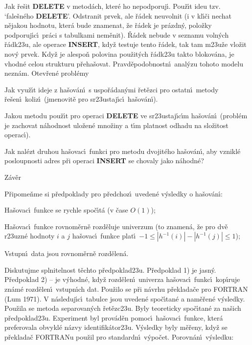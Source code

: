 \flushpar Jak \v re\v sit {\bf DELETE} v metod\'ach, kter\'e ho 
nepodporuj\'\i .\newline 
Pou\v z\'\i t ideu tzv. `fale\v sn\'eho {\bf DELETE}'. 
Odstranit prvek, ale \v r\'adek neuvolnit (i v kl\'\i\v ci nechat 
n\v ejakou hodnotu, kter\'a bude znamenat, \v ze \v r\'adek je 
pr\'azdn\'y, polo\v zky podporuj\'\i c\'\i\ pr\'aci s tabulkami nem\v enit). 
\v R\'adek nebude v seznamu voln\'ych \v r\'adk\accent23u, ale 
operace {\bf INSERT}, kdy\v z testuje tento \v r\'adek, tak tam 
m\accent23u\v ze vlo\v zit nov\'y prvek. Kdy\v z je alespo\v n 
polovina pou\v zit\'ych \v r\'adk\accent23u takto blokov\'ana, je 
vhodn\'e celou strukturu p\v reha\v sovat. Prav\-d\v epodobnostn\'\i\ 
anal\'yzu tohoto modelu nezn\'am.
\medskip
\subhead
Otev\v ren\'e probl\'emy
\endsubhead
\smallskip

\flushpar Jak vyu\v z\'\i t ideje z ha\v sov\'an\'\i\ s uspo\v r\'adan\'ymi 
\v ret\v ezci pro ostatn\'\i\ metody \v re\v sen\'\i\ koliz\'\i\ 
(jmeno\-vit\v e pro sr\accent23ustaj\'\i c\'\i\ ha\v sov\'an\'\i ).
\medskip

\flushpar Jakou metodu pou\v z\'\i t pro operaci {\bf DELETE} ve 
sr\accent23ustaj\'\i c\'\i m ha\v sov\'an\'\i\ (probl\'em je zachovat n\'ahodnost 
ulo\v zen\'e mno\v ziny a t\'\i m platnost odhadu na slo\v zitost operac\'\i ). 
\medskip

\flushpar Jak nal\'ezt druhou ha\v sovac\'\i\ funkci pro metodu 
dvojit\'eho ha\v so\-v\'a\-n\'\i , aby vznikl\'e posloupnosti adres p\v ri operaci 
{\bf INSERT} se chovaly jako n\'ahodn\'e?
\medskip

\subhead
Z\'av\v er
\endsubhead
\smallskip

\flushpar P\v ripome\v nme si p\v redpoklady pro p\v redchoz\'\i\ uveden\'e 
v\'ysledky o ha\v sov\'an\'\i :
\roster
\item
Ha\v sovac\'\i\ funkce se rychle spo\v c\'\i t\'a (v \v case 
$O\left(1\right)$);
\item Ha\v sovac\'\i\ funkce rovnom\v ern\v e rozd\v eluje univerzum (to 
znamen\'a, \v ze pro dv\v e r\accent23uzn\'e hodnoty $i$ a $j$ 
ha\v sovac\'\i\ funkce plat\'\i\ $-1\le |h^{-1}\left(i\right)|-|h^{-1}\left(j\right)|\le 
1$); 
\item 
Vstupn\'\i\ data jsou rovnom\v ern\v e rozd\v elen\'a.
\endroster

\flushpar Diskutujme splnitelnost t\v echto p\v redpoklad\accent23u.\newline
P\v redpoklad 1) je jasn\'y.\newline 
P\v redpoklad 2) -- je v\'yhodn\'e, 
kdy\v z rozd\v elen\'\i\ univerza ha\v sovac\'\i\ funkc\'\i\ kop\'\i ruje zn\'am\'e 
rozd\v ele\-n\'\i\ vstupn\'\i ch dat. Pou\v zilo se p\v ri n\'avrhu 
p\v reklada\v ce pro FORTRAN (Lum 1971). V n\'asle\-du\-j\'\i\-c\'\i\ tabulce jsou uveden\'e spo\v c\'\i tan\'e a nam\v e\v ren\'e v\'ysledky. Pou\v zila se metoda separovan\'ych \v ret\v ezc\accent23u. Byly teoreticky 
spo\v c\'\i tan\'e za na\v sich p\v redpoklad\accent23u. Experiment byl 
prov\'ad\v en pomoc\'\i\ ha\v sovac\'\i\ funkce, kter\'a preferovala 
obvykl\'e n\'azvy identifik\'ator\accent23u. V\'ysledky byly m\v e\v reny, 
kdy\v z se p\v reklada\v c FORTRANu pou\v zil pro standardn\'\i\ v\'ypo\v cet.
Porovn\'an\'\i\ v\'ysledku:

